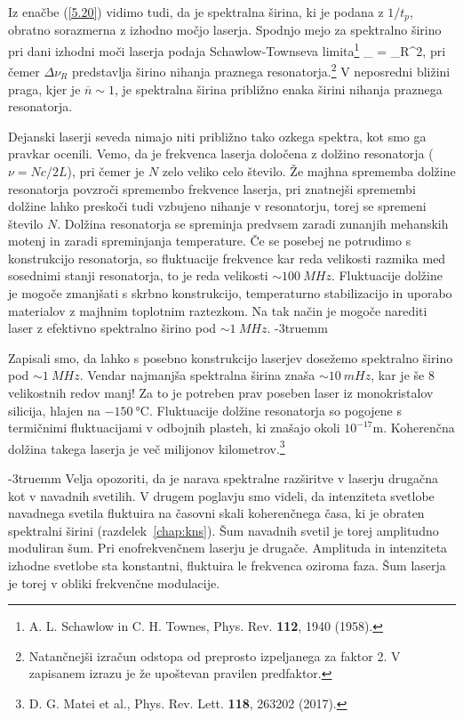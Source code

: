 Iz enačbe (\ref{5.20}) vidimo tudi, da je spektralna širina, ki je
podana z $1/t_{p}$, obratno sorazmerna z izhodno močjo laserja. Spodnjo
mejo za spektralno širino pri dani izhodni moči laserja 
podaja Schawlow-Townseva limita\footnote{A. 
L. Schawlow in C. H. Townes, Phys. Rev. {\bf 112}, 1940 (1958). }
\beq
\Delta \nu_ =  \Delta \nu_R^2,
\eeq
pri čemer $\Delta \nu_R$ predstavlja širino nihanja praznega 
resonatorja.\footnote{Natančnejši izračun odstopa od preprosto izpeljanega za 
faktor 2. V zapisanem izrazu je že upoštevan pravilen predfaktor.}
V neposredni bližini praga, kjer je $\overline{n}\sim 1$, je 
spektralna širina približno enaka širini nihanja praznega resonatorja.

Dejanski laserji seveda nimajo niti približno tako ozkega spektra, kot smo ga
pravkar ocenili. Vemo, da je frekvenca laserja določena z dolžino resonatorja 
($\nu=N c/2L$), pri čemer je $N$ zelo veliko celo število. Že majhna
sprememba dolžine resonatorja povzroči spremembo frekvence laserja, pri 
znatnejši spremembi dolžine lahko preskoči tudi vzbujeno
nihanje v resonatorju, torej se spremeni število $N$. Dolžina resonatorja se 
spreminja predvsem zaradi zunanjih mehanskih motenj in zaradi spreminjanja
temperature. Če se posebej ne potrudimo s konstrukcijo resonatorja, so 
fluktuacije frekvence kar reda velikosti razmika med sosednimi stanji 
resonatorja, to je reda velikosti $\sim 100~\si{MHz}$. 
Fluktuacije dolžine je mogoče zmanjšati s skrbno konstrukcijo, 
temperaturno stabilizacijo in uporabo materialov z majhnim toplotnim raztezkom. 
Na tak način je mogoče narediti laser z efektivno spektralno širino pod $\sim 1~\si{MHz}$.
\vglue-3truemm
\begin{remark}
Zapisali smo, da lahko s posebno konstrukcijo laserjev dosežemo
spektralno širino pod $\sim 1~\si{MHz}$. Vendar najmanjša spektralna širina
znaša $\sim 10~\si{mHz}$, kar je še 8 velikostnih redov manj! Za to je potreben prav poseben 
laser iz monokristalov silicija, hlajen na $-150~\si{\celsius}$. Fluktuacije
dolžine resonatorja so pogojene s termičnimi fluktuacijami v odbojnih plasteh, 
ki znašajo okoli $10^{-17}\si{\metre}$. Koherenčna dolžina takega laserja je več
milijonov kilometrov.\footnote{D. G. Matei et al., Phys. Rev. Lett. {\bf 118}, 263202 (2017).} 
\end{remark}
\vglue-3truemm
Velja opozoriti, da je narava spektralne razširitve v laserju 
drugačna kot v navadnih svetilih. V drugem poglavju smo videli, da 
intenziteta svetlobe navadnega svetila fluktuira na časovni skali 
koherenčnega časa, ki je obraten spektralni širini (razdelek~\ref{chap:kns}). 
Šum navadnih svetil je torej amplitudno moduliran šum. Pri 
enofrekvenčnem laserju je drugače. Amplituda in intenziteta 
izhodne svetlobe sta konstantni, fluktuira le frekvenca oziroma
faza. Šum laserja je torej v obliki frekvenčne modulacije.


